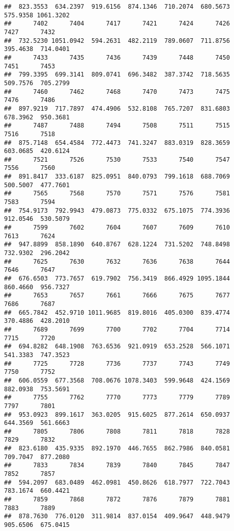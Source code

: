 \documentclass[
]{article}
\begin{document}
\begin{verbatim}
##  823.3553  634.2397  919.6156  874.1346  710.2074  680.5673  575.9358 1061.3202 
##      7402      7404      7417      7421      7424      7426      7427      7432 
##  732.5230 1051.0942  594.2631  482.2119  789.0607  711.8756  395.4638  714.0401 
##      7433      7435      7436      7439      7448      7450      7451      7453 
##  799.3395  699.3141  809.0741  696.3482  387.3742  718.5635  509.7576  705.2799 
##      7460      7462      7468      7470      7473      7475      7476      7486 
##  897.9219  717.7897  474.4906  532.8108  765.7207  831.6803  678.3962  950.3681 
##      7487      7488      7494      7508      7511      7515      7516      7518 
##  875.7148  654.4584  772.4473  741.3247  883.0319  828.3659  603.0685  420.6124 
##      7521      7526      7530      7533      7540      7547      7556      7560 
##  891.8417  333.6187  825.0951  840.0793  799.1618  688.7069  500.5007  477.7601 
##      7565      7568      7570      7571      7576      7581      7583      7594 
##  754.9173  792.9943  479.0873  775.0332  675.1075  774.3936  912.0546  530.5079 
##      7599      7602      7604      7607      7609      7610      7613      7624 
##  947.8899  858.1890  640.8767  628.1224  731.5202  748.8498  732.9302  296.2042 
##      7625      7630      7632      7636      7638      7644      7646      7647 
##  676.6503  773.7657  619.7902  756.3419  866.4929 1095.1844  860.4660  956.7327 
##      7653      7657      7661      7666      7675      7677      7686      7687 
##  665.7842  452.9710 1011.9685  819.8016  405.0300  839.4774  370.4886  428.2010 
##      7689      7699      7700      7702      7704      7714      7715      7720 
##  694.8282  648.1908  763.6536  921.0919  653.2528  566.1071  541.3383  747.3523 
##      7725      7728      7736      7737      7743      7749      7750      7752 
##  606.0559  677.3568  708.0676 1078.3403  599.9648  424.1569  882.0938  753.5691 
##      7755      7762      7770      7773      7779      7789      7797      7801 
##  953.0923  899.1617  363.0205  915.6025  877.2614  650.0937  644.3569  561.6663 
##      7805      7806      7808      7811      7818      7828      7829      7832 
##  823.6180  435.9335  892.1970  446.7655  862.7986  840.0581  709.7047  877.2080 
##      7833      7834      7839      7840      7845      7847      7852      7857 
##  594.2097  683.0489  462.0981  450.8626  618.7977  722.7043  783.1674  660.4421 
##      7859      7868      7872      7876      7879      7881      7883      7889 
##  878.7630  776.0120  311.9814  837.0154  409.9647  448.9479  905.6506  675.0415 

\end{verbatim}
\end{document}
